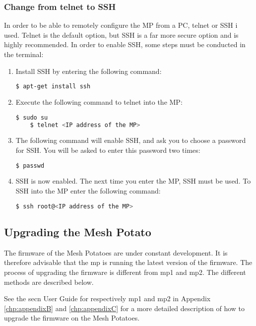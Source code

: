 \subsubsection{Change from telnet to SSH}
\label{subsubsec:ssh}
In order to be able to remotely configure the MP from a PC, telnet or SSH i used. Telnet is the default option, but SSH is a far more secure option and is highly recommended. In order to enable SSH, some steps must be conducted in the terminal:
\begin{enumerate}
\item Install SSH by entering the following command:
\noindent
\begin{lstlisting}[language=bash]
	$ apt-get install ssh
\end{lstlisting}
\item Execute the following command to telnet into the MP:
\noindent
\begin{lstlisting}[language=bash]
	$ sudo su
	$ telnet <IP address of the MP>
\end{lstlisting}
\item The following command will enable SSH, and ask you to choose a password for SSH. You will be asked to enter this password two times:
\noindent
\begin{lstlisting}[language=bash]
	$ passwd
\end{lstlisting}
\item SSH is now enabled. The next time you enter the MP, SSH must be used. To SSH into the MP enter the following command:
\noindent
\begin{lstlisting}[language=bash]
	$ ssh root@<IP address of the MP>
\end{lstlisting}
\end{enumerate}


\subsection{Upgrading the Mesh Potato}
\label{subsec:upgrading}
The firmware of the Mesh Potatoes are under constant development. It is therefore advisable that the \gls{mp} is running the latest version of the firmware. The process of upgrading the firmware is different from \gls{mp1} and \gls{mp2}. The different methods are described below. 

See the \gls{secn} User Guide for respectively \gls{mp1} and \gls{mp2} in Appendix \ref{chp:appendixB} and \ref{chp:appendixC} for a more detailed description of how to upgrade the firmware on the Mesh Potatoes.


